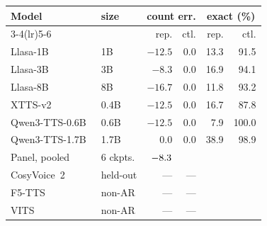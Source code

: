 \begin{tabular}{llrrrr}
\toprule
Model & size & \multicolumn{2}{c}{count err.} & \multicolumn{2}{c}{exact (\%)} \\
\cmidrule(lr){3-4}\cmidrule(lr){5-6}
 & & rep. & ctl. & rep. & ctl. \\
\midrule
Llasa-1B~\cite{ye2025llasa} & 1B & $-12.5$ & 0.0 & 13.3 & 91.5 \\
Llasa-3B~\cite{ye2025llasa} & 3B & $-8.3$ & 0.0 & 16.9 & 94.1 \\
Llasa-8B~\cite{ye2025llasa} & 8B & $-16.7$ & 0.0 & 11.8 & 93.2 \\
XTTS-v2~\cite{casanova2024xtts} & 0.4B & $-12.5$ & 0.0 & 16.7 & 87.8 \\
Qwen3-TTS-0.6B~\cite{hu2026qwen3tts} & 0.6B & $-12.5$ & 0.0 & 7.9 & 100.0 \\
Qwen3-TTS-1.7B~\cite{hu2026qwen3tts} & 1.7B & 0.0 & 0.0 & 38.9 & 98.9 \\
\midrule
Panel, pooled & 6 ckpts. & $-8.3{}$ & \ErrCtl{} & \ARPoolRep{} & \ARPoolCtl{} \\
CosyVoice~2~\cite{du2024cosyvoice2} & held-out & --- & --- & \CosyRep{} & \CosyCtl{} \\
F5-TTS~\cite{chen2024f5tts} & non-AR & --- & --- & \FivettsRep{} & \FivettsCtl{} \\
VITS~\cite{kim2021vits} & non-AR & --- & --- & \VitsRep{} & \VitsCtl{} \\
\bottomrule
\end{tabular}
